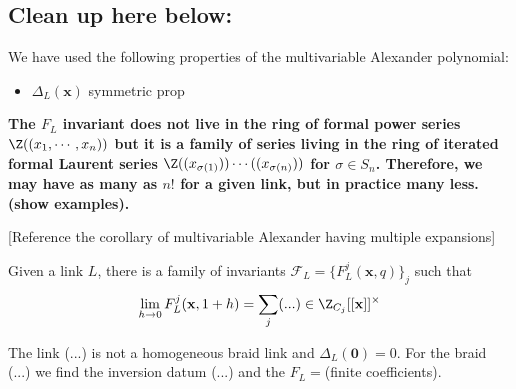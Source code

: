 \documentclass[11pt,e-only]{amsart}
\begin{document}




\subsection{Clean up here below:}

We have used the following properties of the multivariable Alexander polynomial:
\begin{itemize}
    \item $\Delta_L(\mathbf{x})$ \alert{symmetric prop}
\end{itemize}

\textbf{The $F_L$ invariant does not live in the ring of formal power series $\Z((x_1,\cdots,x_n))$ but it is a family of series living in the ring of iterated formal Laurent series $\Z((x_{\sigma(1)}))\cdots((x_{\sigma(n)}))$ for $\sigma\in S_n$. Therefore, we may have as many as $n!$ for a given link, but in practice many less. (show examples).}

[Reference the corollary of multivariable Alexander having multiple expansions]

\begin{conjecture} Given a link $L$, there is a family of invariants $\mathcal{F}_L=\{F^j_L(\mathbf{x},q)\}_{j}$ such that
\begin{equation}
    \lim_{h\rightarrow 0} F^j_L(\mathbf{x},1+h) =\sum_{j}(...)\in\Z_{C_j}[[\mathbf{x}]]^\times
\end{equation}
\end{conjecture}

\begin{example} The link (...) is not a homogeneous braid link and $\Delta_L(\mathbf{0})=0$. For the braid (...) we find the inversion datum (...) and the $F_L = $(finite coefficients).
\end{example}
\end{document}
